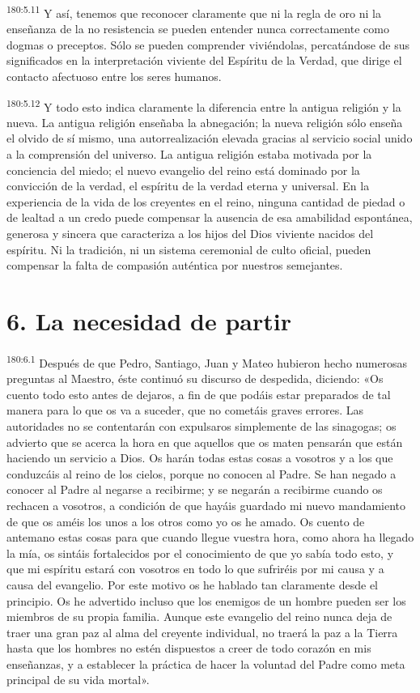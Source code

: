 \par 
\textsuperscript{180:5.11} Y así, tenemos que reconocer claramente que ni la regla de oro ni la enseñanza de la no resistencia se pueden entender nunca correctamente como dogmas o preceptos. Sólo se pueden comprender viviéndolas, percatándose de sus significados en la interpretación viviente del Espíritu de la Verdad, que dirige el contacto afectuoso entre los seres humanos.

\par 
\textsuperscript{180:5.12} Y todo esto indica claramente la diferencia entre la antigua religión y la nueva. La antigua religión enseñaba la abnegación; la nueva religión sólo enseña el olvido de sí mismo, una autorrealización elevada gracias al servicio social unido a la comprensión del universo. La antigua religión estaba motivada por la conciencia del miedo; el nuevo evangelio del reino está dominado por la convicción de la verdad, el espíritu de la verdad eterna y universal. En la experiencia de la vida de los creyentes en el reino, ninguna cantidad de piedad o de lealtad a un credo puede compensar la ausencia de esa amabilidad espontánea, generosa y sincera que caracteriza a los hijos del Dios viviente nacidos del espíritu. Ni la tradición, ni un sistema ceremonial de culto oficial, pueden compensar la falta de compasión auténtica por nuestros semejantes.

\section*{6. La necesidad de partir}
\par 
\textsuperscript{180:6.1} Después de que Pedro, Santiago, Juan y Mateo hubieron hecho numerosas preguntas al Maestro, éste continuó su discurso de despedida, diciendo: «Os cuento todo esto antes de dejaros, a fin de que podáis estar preparados de tal manera para lo que os va a suceder, que no cometáis graves errores. Las autoridades no se contentarán con expulsaros simplemente de las sinagogas; os advierto que se acerca la hora en que aquellos que os maten pensarán que están haciendo un servicio a Dios. Os harán todas estas cosas a vosotros y a los que conduzcáis al reino de los cielos, porque no conocen al Padre. Se han negado a conocer al Padre al negarse a recibirme; y se negarán a recibirme cuando os rechacen a vosotros, a condición de que hayáis guardado mi nuevo mandamiento de que os améis los unos a los otros como yo os he amado. Os cuento de antemano estas cosas para que cuando llegue vuestra hora, como ahora ha llegado la mía, os sintáis fortalecidos por el conocimiento de que yo sabía todo esto, y que mi espíritu estará con vosotros en todo lo que sufriréis por mi causa y a causa del evangelio. Por este motivo os he hablado tan claramente desde el principio. Os he advertido incluso que los enemigos de un hombre pueden ser los miembros de su propia familia. Aunque este evangelio del reino nunca deja de traer una gran paz al alma del creyente individual, no traerá la paz a la Tierra hasta que los hombres no estén dispuestos a creer de todo corazón en mis enseñanzas, y a establecer la práctica de hacer la voluntad del Padre como meta principal de su vida mortal».


